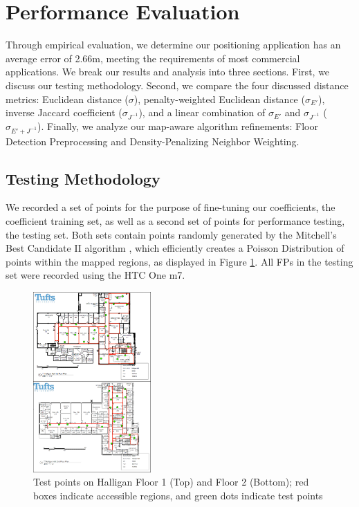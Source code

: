 \documentclass[conference]{IEEEtran}
\begin{document}
\section{Performance Evaluation}

Through empirical evaluation, we determine our positioning application has an average error of 2.66m, meeting the requirements of most commercial applications. We break our results and analysis into three sections. First, we discuss our testing methodology. Second, we compare the four discussed distance metrics: Euclidean distance ($\sigma$), penalty-weighted Euclidean distance ($\sigma_{E'}$), inverse Jaccard coefficient ($\sigma_{J^{-1}}$), and a linear combination of $\sigma_{E'}$ and $\sigma_{J^{-1}}$ ($\sigma_{E' + J^{-1}}$). Finally, we analyze our map-aware algorithm refinements: Floor Detection Preprocessing and Density-Penalizing Neighbor Weighting.

\subsection{Testing Methodology}
We recorded a set of points for the purpose of fine-tuning our coefficients, the coefficient training set, as well as a second set of points for performance testing, the testing set. Both sets contain points randomly generated by the Mitchell's Best Candidate II algorithm \cite{Machaj}, which efficiently creates a Poisson Distribution of points within the mapped regions, as displayed in Figure \ref{fig:test_points}. All FPs in the testing set were recorded using the HTC One m7. 

\begin{figure}[t!]
  \centering
    \includegraphics[width=0.4\textwidth]{TestFloors.png}
   \caption{Test points on Halligan Floor 1 (Top) and Floor 2 (Bottom); red boxes indicate accessible regions, and green dots indicate test points}
   \label{fig:test_points}
\end{figure}
\end{document}
